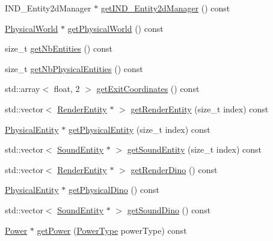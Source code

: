 \begin{DoxyCompactItemize}
\item 
I\-N\-D\-\_\-\-Entity2d\-Manager $\ast$ \hyperlink{class_symp_1_1_entity_manager_aa1babaa1b11f1a0bcdcf5d7c1fe1d3d9}{get\-I\-N\-D\-\_\-\-Entity2d\-Manager} () const 
\item 
\hyperlink{class_symp_1_1_physical_world}{Physical\-World} $\ast$ \hyperlink{class_symp_1_1_entity_manager_afc649b64f5851802facf34afb1dff150}{get\-Physical\-World} () const 
\item 
size\-\_\-t \hyperlink{class_symp_1_1_entity_manager_adafba7ec7121cfd1e7f187e027b8ed3d}{get\-Nb\-Entities} () const 
\item 
size\-\_\-t \hyperlink{class_symp_1_1_entity_manager_a19b90189de9bb0cf8111eda5ec705b6c}{get\-Nb\-Physical\-Entities} () const 
\item 
std\-::array$<$ float, 2 $>$ \hyperlink{class_symp_1_1_entity_manager_af3cea4bd58d629124c47f851174b7334}{get\-Exit\-Coordinates} () const 
\item 
std\-::vector$<$ \hyperlink{class_symp_1_1_render_entity}{Render\-Entity} $\ast$ $>$ \hyperlink{class_symp_1_1_entity_manager_a21aa2e05e4bd2d526306e173c5ca2381}{get\-Render\-Entity} (size\-\_\-t index) const 
\item 
\hyperlink{class_symp_1_1_physical_entity}{Physical\-Entity} $\ast$ \hyperlink{class_symp_1_1_entity_manager_a11ac1efae3f8651994f01ce9df305393}{get\-Physical\-Entity} (size\-\_\-t index) const 
\item 
std\-::vector$<$ \hyperlink{class_symp_1_1_sound_entity}{Sound\-Entity} $\ast$ $>$ \hyperlink{class_symp_1_1_entity_manager_a95ce86f8088b0ebf5b8d19f427d588ac}{get\-Sound\-Entity} (size\-\_\-t index) const 
\item 
std\-::vector$<$ \hyperlink{class_symp_1_1_render_entity}{Render\-Entity} $\ast$ $>$ \hyperlink{class_symp_1_1_entity_manager_ac1dfb6cba31d95ec8369e7dbb54eac1b}{get\-Render\-Dino} () const 
\item 
\hyperlink{class_symp_1_1_physical_entity}{Physical\-Entity} $\ast$ \hyperlink{class_symp_1_1_entity_manager_a813a586c35f339bf57db018191d893ce}{get\-Physical\-Dino} () const 
\item 
std\-::vector$<$ \hyperlink{class_symp_1_1_sound_entity}{Sound\-Entity} $\ast$ $>$ \hyperlink{class_symp_1_1_entity_manager_a11d90dba29177f8c6c5b597116d4949e}{get\-Sound\-Dino} () const 
\item 
\hyperlink{class_symp_1_1_power}{Power} $\ast$ \hyperlink{class_symp_1_1_entity_manager_a56a75c8ac95c235d4740d61315c841c5}{get\-Power} (\hyperlink{namespace_symp_a81b2b15da470e4ace7de6835ebe0f8ba}{Power\-Type} power\-Type) const 

\end{DoxyCompactItemize}
